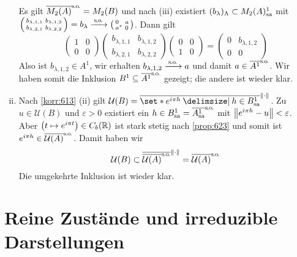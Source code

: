\begin{beweis}
\begin{enumerate}[(i)]
		 Es gilt $\overline{M_2(A)}^\so=M_2(B)$ und nach (iii) existiert $(b_\lambda)_\Lambda \subset M_2(A)^1_\sa$ mit 
		 \(
		 	\begin{psmallmatrix}
		 		b_{\lambda,1,1} & b_{\lambda,1,2} \\
				b_{\lambda,2,1} & b_{\lambda,2,2}
		 	\end{psmallmatrix}
			=b_\lambda \grenzw{\so} \begin{psmallmatrix*}[l]
				0 & a \\
				a^* & 0
			\end{psmallmatrix*}
		 \).
		 Dann gilt
		 \[
		 	\begin{pmatrix}
		 		1 &0 \\
				0 & 0
		 	\end{pmatrix} 
			\begin{pmatrix}
		 		b_{\lambda,1,1} & b_{\lambda,1,2} \\
				b_{\lambda,2,1} & b_{\lambda,2,2}
			\end{pmatrix}
			\begin{pmatrix}
				0 & 0 \\
				1 & 0
			\end{pmatrix} =
			\begin{pmatrix}
				0 & b_{\lambda,1,2} \\
				0 & 0
			\end{pmatrix}
		 \]
		 Also ist $b_{\lambda,1,2} \in A^1$, wir erhalten $b_{\lambda,1,2} \grenzw{\so} a$ und damit $a \in \overline{A^1}^\so$.
		 Wir haben somit die Inklusion $B^1 \subseteq \overline{A^1}^\so$ gezeigt; die andere ist wieder klar.
		 \item Nach \autoref{korr:613} (ii) gilt $\mathcal{U}(B) = \overline{\set*{e^{i \pi h} \given h \in B^1_\sa}}^{\norm*{\cdot}}$.
		 Zu $u \in \mathcal{U}(B)$ und $\varepsilon>0$ existiert ein $h \in B^1_\sa=\overline{A^1_\sa}^\so$ mit $\norm*{e^{i \pi h}-u}<\varepsilon$.
		 Aber $\enbrace*{t \mapsto e^{i \pi t}} \in C_b(\mathbb{R})$ ist stark stetig nach \autoref{prop:623} und somit ist $e^{i \pi h} \in \overline{\mathcal{U}(A)}^\so$.
		 Damit haben wir
		 \[
		 	\mathcal{U}(B) \subset \overline{\overline{\mathcal{U}(A)}^\so}^{\norm*{\cdot}} = \overline{\mathcal{U}(A)}^\so
		 \]
		 Die umgekehrte Inklusion ist wieder klar. \qedhere
	\end{enumerate}
\end{beweis}
\newpage

\section{Reine Zustände und irreduzible Darstellungen} %
\label{sec:7}

